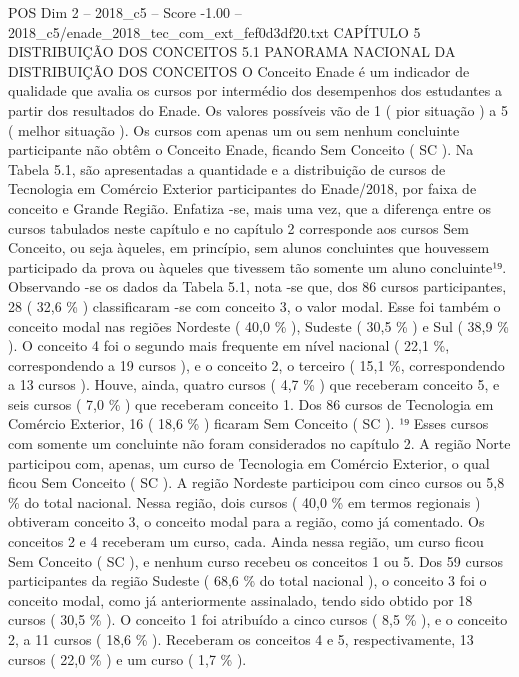 \begin{textsample}{POS Dim 2 – 2018\_c5 – Score -1.00 – 2018\_c5/enade\_2018\_tec\_com\_ext\_fef0d3df20.txt}  \label{ex:f2_pos_315}
CAPÍTULO 5 DISTRIBUIÇÃO DOS CONCEITOS 5.1 PANORAMA NACIONAL DA DISTRIBUIÇÃO DOS CONCEITOS O Conceito Enade é um indicador de qualidade que avalia os cursos por intermédio dos desempenhos dos estudantes a partir dos resultados do Enade.
Os valores possíveis vão de 1 ( pior situação ) a 5 ( melhor situação ).
Os cursos com apenas um ou sem nenhum concluinte participante não obtêm o Conceito Enade, ficando Sem Conceito ( SC ).
Na Tabela 5.1, são apresentadas a quantidade e a distribuição de cursos de Tecnologia em Comércio Exterior participantes do Enade/2018, por faixa de conceito e Grande Região.
Enfatiza -se, mais uma vez, que a diferença entre os cursos tabulados neste capítulo e no capítulo 2 corresponde aos cursos Sem Conceito, ou seja àqueles, em princípio, sem alunos concluintes que houvessem participado da prova ou àqueles que tivessem tão somente um aluno concluinte¹⁹.
Observando -se os dados da Tabela 5.1, nota -se que, dos 86 cursos participantes, 28 ( 32,6 \% ) classificaram -se com conceito 3, o valor modal.
Esse foi também o conceito modal nas regiões Nordeste ( 40,0 \% ), Sudeste ( 30,5 \% ) e Sul ( 38,9 \% ).
O conceito 4 foi o segundo mais frequente em nível nacional ( 22,1 \%, correspondendo a 19 cursos ), e o conceito 2, o terceiro ( 15,1 \%, correspondendo a 13 cursos ).
Houve, ainda, quatro cursos ( 4,7 \% ) que receberam conceito 5, e seis cursos ( 7,0 \% ) que receberam conceito 1.
Dos 86 cursos de Tecnologia em Comércio Exterior, 16 ( 18,6 \% ) ficaram Sem Conceito ( SC ). ¹⁹ Esses cursos com somente um concluinte não foram considerados no capítulo 2.
A região Norte participou com, apenas, um curso de Tecnologia em Comércio Exterior, o qual ficou Sem Conceito ( SC ).
A região Nordeste participou com cinco cursos ou 5,8 \% do total nacional.
Nessa região, dois cursos ( 40,0 \% em termos regionais ) obtiveram conceito 3, o conceito modal para a região, como já comentado.
Os conceitos 2 e 4 receberam um curso, cada.
Ainda nessa região, um curso ficou Sem Conceito ( SC ), e nenhum curso recebeu os conceitos 1 ou 5.
Dos 59 cursos participantes da região Sudeste ( 68,6 \% do total nacional ), o conceito 3 foi o conceito modal, como já anteriormente assinalado, tendo sido obtido por 18 cursos ( 30,5 \% ).
O conceito 1 foi atribuído a cinco cursos ( 8,5 \% ), e o conceito 2, a 11 cursos ( 18,6 \% ).
Receberam os conceitos 4 e 5, respectivamente, 13 cursos ( 22,0 \% ) e um curso ( 1,7 \% ).

\end{textsample}
